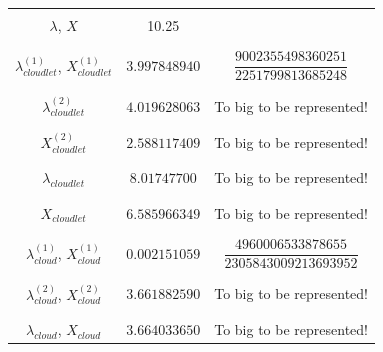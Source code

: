 \documentclass[10pt,a4paper]{article}
\begin{document}
\begin{table}[h!]
\begin{adjustbox}{center=\textwidth}
\begin{tabular}{c|c|c}
	 &&\\\hline &&\\

	 $\lambda$, $X$ & 10.25 & \\
	 
	 &&\\\hline &&\\
	
	 $\lambda_{cloudlet}^{(1)}$, $X_{cloudlet}^{(1)}$ & $3.997848940$ & $\dfrac{9002355498360251}{2251799813685248}$ \\
	 
	 &&\\\hline &&\\
	 
	 $\lambda_{cloudlet}^{(2)}$ & $4.019628063$ & To big to be represented! \\
	 
	 &&\\\hline &&\\	 
	 
	 $X_{cloudlet}^{(2)}$ & $2.588117409$ & To big to be represented! \\
	 
	 &&\\\hline &&\\
	 
	 $\lambda_{cloudlet}$ & $8.01747700$ & To big to be represented! \\
	 
	 &&\\\hline &&\\
	 
	 $X_{cloudlet}$ & $6.585966349$ & To big to be represented! \\
	 
	 &&\\\hline &&\\
	
	 $\lambda_{cloud}^{(1)}$, $X_{cloud}^{(1)}$ & $0.002151059$ & $\dfrac{4960006533878655}{2305843009213693952}$ \\

	 &&\\\hline &&\\
	
	 $\lambda_{cloud}^{(2)}$, $X_{cloud}^{(2)}$ & $3.661882590$ &  To big to be represented! \\

	 &&\\\hline &&\\
	
	 $\lambda_{cloud}$, $X_{cloud}$ & $3.664033650$ &  To big to be represented! \\


\end{tabular}
\end{adjustbox}
\end{table}
\end{document}
